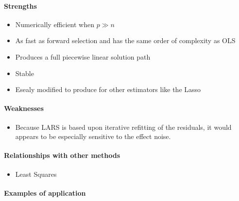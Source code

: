 \paragraph{Strengths}
\begin{itemize}
	\item Numerically efficient when $p\gg n$
	\item As fast as forward selection and has the same order of complexity as OLS
	\item Produces a full piecewise linear solution path
	\item Stable
	\item Esealy modified to produce for other estimators like the Lasso
\end{itemize}

\paragraph{Weaknesses}
\begin{itemize}
    \item Because LARS is based upon iterative refitting of the residuals, it would
		appears to be especially sensitive to the effect noise.
\end{itemize}

\paragraph{Relationships with other methods}
\begin{itemize}
    \item Least Squares
\end{itemize}

\paragraph{Examples of application}


